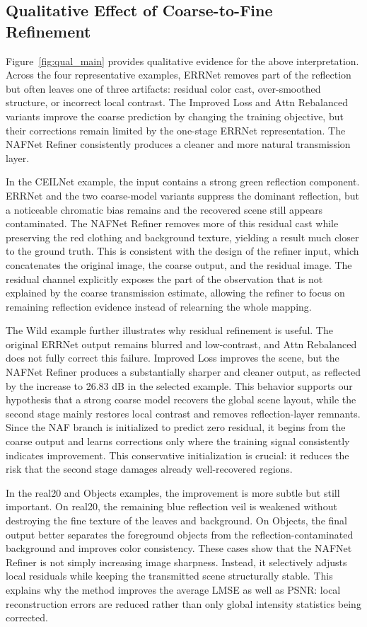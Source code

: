 \subsection{Qualitative Effect of Coarse-to-Fine Refinement}

Figure~\ref{fig:qual_main} provides qualitative evidence for the above interpretation. Across the four representative examples, ERRNet removes part of the reflection but often leaves one of three artifacts: residual color cast, over-smoothed structure, or incorrect local contrast. The Improved Loss and Attn Rebalanced variants improve the coarse prediction by changing the training objective, but their corrections remain limited by the one-stage ERRNet representation. The NAFNet Refiner consistently produces a cleaner and more natural transmission layer.

In the CEILNet example, the input contains a strong green reflection component. ERRNet and the two coarse-model variants suppress the dominant reflection, but a noticeable chromatic bias remains and the recovered scene still appears contaminated. The NAFNet Refiner removes more of this residual cast while preserving the red clothing and background texture, yielding a result much closer to the ground truth. This is consistent with the design of the refiner input, which concatenates the original image, the coarse output, and the residual image. The residual channel explicitly exposes the part of the observation that is not explained by the coarse transmission estimate, allowing the refiner to focus on remaining reflection evidence instead of relearning the whole mapping.

The Wild example further illustrates why residual refinement is useful. The original ERRNet output remains blurred and low-contrast, and Attn Rebalanced does not fully correct this failure. Improved Loss improves the scene, but the NAFNet Refiner produces a substantially sharper and cleaner output, as reflected by the increase to 26.83 dB in the selected example. This behavior supports our hypothesis that a strong coarse model recovers the global scene layout, while the second stage mainly restores local contrast and removes reflection-layer remnants. Since the NAF branch is initialized to predict zero residual, it begins from the coarse output and learns corrections only where the training signal consistently indicates improvement. This conservative initialization is crucial: it reduces the risk that the second stage damages already well-recovered regions.

In the real20 and Objects examples, the improvement is more subtle but still important. On real20, the remaining blue reflection veil is weakened without destroying the fine texture of the leaves and background. On Objects, the final output better separates the foreground objects from the reflection-contaminated background and improves color consistency. These cases show that the NAFNet Refiner is not simply increasing image sharpness. Instead, it selectively adjusts local residuals while keeping the transmitted scene structurally stable. This explains why the method improves the average LMSE as well as PSNR: local reconstruction errors are reduced rather than only global intensity statistics being corrected.

